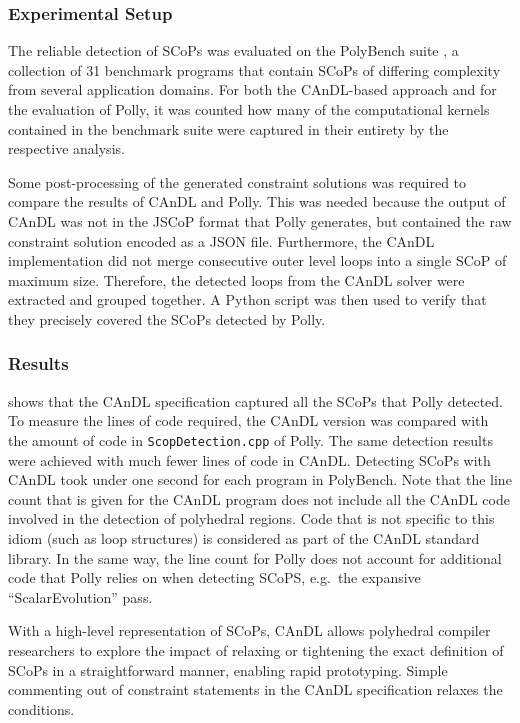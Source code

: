 \subsubsection{Experimental Setup}

    The reliable detection of SCoPs was evaluated on the PolyBench suite
    \citep{polybench}, a collection of 31 benchmark programs that contain SCoPs
    of differing complexity from several application domains.
    For both the CAnDL-based approach and for the evaluation of Polly, it was
    counted how many of the computational kernels contained in the benchmark
    suite were captured in their entirety by the respective analysis.

    Some post-processing of the generated constraint solutions was required to
    compare the results of CAnDL and Polly.
    This was needed because the output of CAnDL was not in the JSCoP format
    that Polly generates, but contained the raw constraint solution
    encoded as a JSON file.
    Furthermore, the CAnDL implementation did not merge consecutive outer level
    loops into a single SCoP of maximum size.
    Therefore, the detected loops from the CAnDL solver were extracted and
    grouped together.
    A Python script was then used to verify that they precisely covered the
    SCoPs detected by Polly.

\subsubsection{Results}

     shows that the CAnDL specification captured all the
    SCoPs that Polly detected.
    To measure the lines of code required, the CAnDL version was compared with
    the amount of code in {\tt ScopDetection.cpp} of Polly.
    The same detection results were achieved with much fewer lines of code in
    CAnDL.
    Detecting SCoPs with CAnDL took under one second for each program in
    PolyBench.
    Note that the line count that is given for the CAnDL program does not
    include all the CAnDL code involved in the detection of polyhedral regions.
    Code that is not specific to this idiom (such as loop structures) is
    considered as part of the CAnDL standard library.
    In the same way, the line count for Polly does not account for additional
    code that Polly relies on when detecting SCoPS, e.g.\ the expansive
    ``ScalarEvolution'' pass.

    With a high-level representation of SCoPs, CAnDL allows polyhedral
    compiler researchers to explore the impact of relaxing or tightening the
    exact definition of SCoPs in a straightforward manner, enabling rapid
    prototyping.
    Simple commenting out of constraint statements in the CAnDL specification
    relaxes the conditions.

